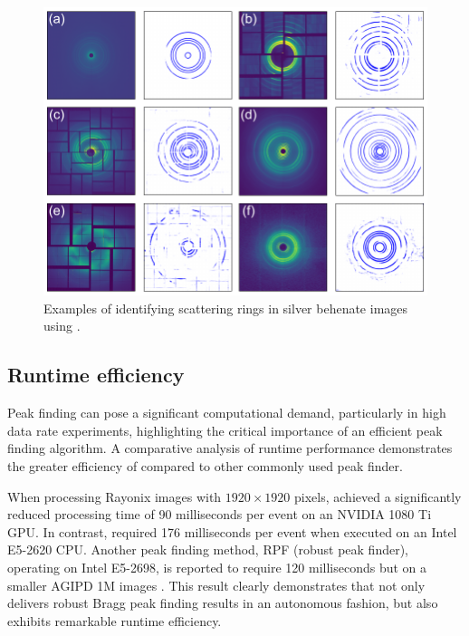 \documentclass[a4paper]{article}
\begin{document}
\begin{figure}[!ht]
\centering
\includegraphics[width=\textwidth,keepaspectratio]
{./figures/automask.agbehnate.pdf}
\caption{Examples of identifying scattering rings in silver behenate images using
\peaknet{}.}
\label{fig : automask 2}
\end{figure}


\subsection{Runtime efficiency}

Peak finding can pose a significant computational demand, particularly in high data rate experiments, highlighting the critical importance of an efficient peak finding algorithm.  A comparative analysis of runtime performance demonstrates the greater efficiency of \peaknet{} compared to other commonly used \psocake{} peak finder.

When processing Rayonix images with $1920 \times 1920$ pixels, \peaknet{} achieved a significantly reduced processing time of 90 milliseconds per event on an NVIDIA 1080 Ti GPU.  In contrast, \psocake{} required 176 milliseconds per event when executed on an Intel E5-2620 CPU.  Another peak finding method, RPF (robust peak finder), operating on Intel E5-2698, is reported to require 120 milliseconds but on a smaller AGIPD 1M images \citep{hadian-jaziDataReductionSerial2021}.  This result clearly demonstrates that \peaknet{} not only delivers robust Bragg peak finding results in an autonomous fashion, but also exhibits remarkable runtime efficiency.  %
\end{document}
